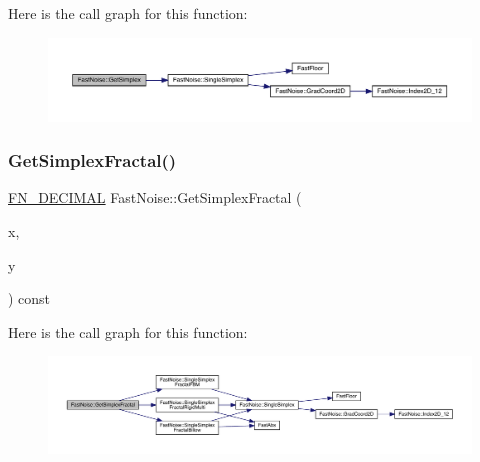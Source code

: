 Here is the call graph for this function\+:
\nopagebreak
\begin{figure}[H]
\begin{center}
\leavevmode
\includegraphics[width=350pt]{class_fast_noise_a699fc06c0d6abe30627c2131606b6bfa_cgraph}
\end{center}
\end{figure}
\mbox{\label{class_fast_noise_a7b839d08e67cfa821b4c1094c9d50e95}} 
\subsubsection{\texorpdfstring{Get\+Simplex\+Fractal()}{GetSimplexFractal()}\hspace{0.1cm}{\footnotesize\ttfamily [1/2]}}
{\footnotesize\ttfamily \mbox{\hyperlink{_fast_noise_8h_a75a9ef6d2541c4921815b885bfd449c3}{F\+N\+\_\+\+D\+E\+C\+I\+M\+AL}} Fast\+Noise\+::\+Get\+Simplex\+Fractal (\begin{DoxyParamCaption}\item[{\mbox{\hyperlink{_fast_noise_8h_a75a9ef6d2541c4921815b885bfd449c3}{F\+N\+\_\+\+D\+E\+C\+I\+M\+AL}}}]{x,  }\item[{\mbox{\hyperlink{_fast_noise_8h_a75a9ef6d2541c4921815b885bfd449c3}{F\+N\+\_\+\+D\+E\+C\+I\+M\+AL}}}]{y }\end{DoxyParamCaption}) const}

Here is the call graph for this function\+:
\nopagebreak
\begin{figure}[H]
\begin{center}
\leavevmode
\includegraphics[width=350pt]{class_fast_noise_a7b839d08e67cfa821b4c1094c9d50e95_cgraph}
\end{center}
\end{figure}
\mbox{\label{class_fast_noise_a56b14e348cf0762010e6c58b6f5243f9}} 
